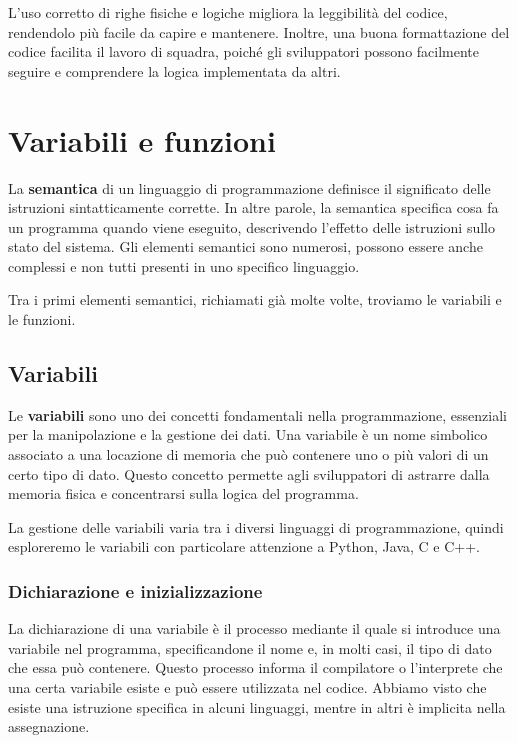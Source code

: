 \documentclass[
  letterpaper,
]{scrbook}
\begin{document}
L'uso corretto di righe fisiche e logiche migliora la leggibilità del
codice, rendendolo più facile da capire e mantenere. Inoltre, una buona
formattazione del codice facilita il lavoro di squadra, poiché gli
sviluppatori possono facilmente seguire e comprendere la logica
implementata da altri.

\chapter{Variabili e funzioni}\label{variabili-e-funzioni}

La \textbf{semantica} di un linguaggio di programmazione definisce il
significato delle istruzioni sintatticamente corrette. In altre parole,
la semantica specifica cosa fa un programma quando viene eseguito,
descrivendo l'effetto delle istruzioni sullo stato del sistema. Gli
elementi semantici sono numerosi, possono essere anche complessi e non
tutti presenti in uno specifico linguaggio.

Tra i primi elementi semantici, richiamati già molte volte, troviamo le
variabili e le funzioni.

\section{Variabili}\label{variabili}

Le \textbf{variabili} sono uno dei concetti fondamentali nella
programmazione, essenziali per la manipolazione e la gestione dei dati.
Una variabile è un nome simbolico associato a una locazione di memoria
che può contenere uno o più valori di un certo tipo di dato. Questo
concetto permette agli sviluppatori di astrarre dalla memoria fisica e
concentrarsi sulla logica del programma.

La gestione delle variabili varia tra i diversi linguaggi di
programmazione, quindi esploreremo le variabili con particolare
attenzione a Python, Java, C e C++.

\subsection{Dichiarazione e
inizializzazione}\label{dichiarazione-e-inizializzazione}

La dichiarazione di una variabile è il processo mediante il quale si
introduce una variabile nel programma, specificandone il nome e, in
molti casi, il tipo di dato che essa può contenere. Questo processo
informa il compilatore o l'interprete che una certa variabile esiste e
può essere utilizzata nel codice. Abbiamo visto che esiste una
istruzione specifica in alcuni linguaggi, mentre in altri è implicita
nella assegnazione.
\end{document}
